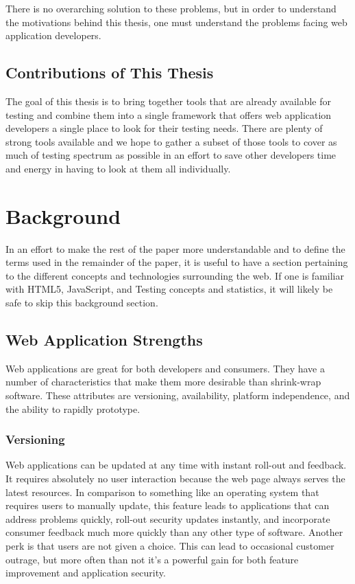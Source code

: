 \documentclass[11pt]{article}
\begin{document}
There is no overarching solution to these problems, but in order to understand the motivations behind this thesis, one must understand the problems facing web application developers.

\subsection{Contributions of This Thesis}
The goal of this thesis is to bring together tools that are already available for testing and combine them into a single framework that offers web application developers a single place to look for their testing needs. There are plenty of strong tools available and we hope to gather a subset of those tools to cover as much of testing spectrum as possible in an effort to save other developers time and energy in having to look at them all individually.

\section{Background}
In an effort to make the rest of the paper more understandable and to define the terms used in the remainder of the paper, it is useful to have a section pertaining to the different concepts and technologies surrounding the web.
If one is familiar with HTML5, JavaScript, and Testing concepts and statistics, it will likely be safe to skip this background section.

\subsection{Web Application Strengths}
Web applications are great for both developers and consumers. They have a number of characteristics that make them more desirable than shrink-wrap software. These attributes are versioning, availability, platform independence, and the ability to rapidly prototype.

\subsubsection{Versioning}
Web applications can be updated at any time with instant roll-out and feedback. It requires absolutely no user interaction because the web page always serves the latest resources. In comparison to something like an operating system that requires users to manually update, this feature leads to applications that can address problems quickly, roll-out security updates instantly, and incorporate consumer feedback much more quickly than any other type of software. Another perk is that users are not given a choice. This can lead to occasional customer outrage, but more often than not it's a powerful gain for both feature improvement and application security.
\end{document}
